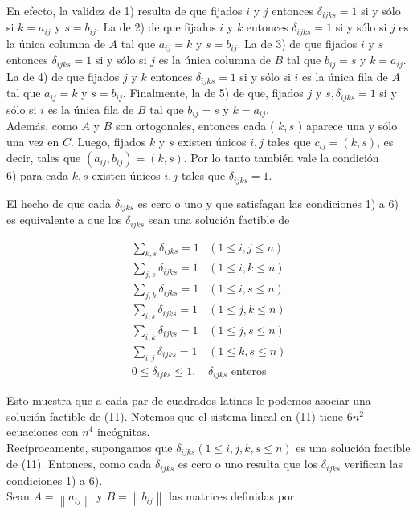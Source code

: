 \documentclass[10pt]{article}
\begin{document}
En efecto, la validez de 1) resulta de que fijados $i$ y $j$ entonces $\delta_{i j k s}=1$ si y sólo si $k=a_{i j}$ y $s=b_{i j}$. La de 2) de que fijados $i$ y $k$ entonces $\delta_{i j k s}=1$ si y sólo si $j$ es la única columna de $A$ tal que $a_{i j}=k$ y $s=b_{i j}$. La de 3) de que fijados $i$ y $s$ entonces $\delta_{i j k s}=1$ si y sólo si $j$ es la única columna de $B$ tal que $b_{i j}=s$ y $k=a_{i j}$. La de 4) de que fijados $j$ y $k$ entonces $\delta_{i j k s}=1$ si y sólo si $i$ es la única fila de $A$ tal que $a_{i j}=k$ y $s=b_{i j}$. Finalmente, la de 5) de que, fijados $j$ y $s, \delta_{i j k s}=1$ si y sólo si $i$ es la única fila de $B$ tal que $b_{i j}=s$ y $k=a_{i j}$.\\
Además, como $A$ y $B$ son ortogonales, entonces cada ( $k, s$ ) aparece una y sólo una vez en $C$. Luego, fijados $k$ y $s$ existen únicos $i, j$ tales que $c_{i j}=(k, s)$, es decir, tales que $\left(a_{i j}, b_{i j}\right)=(k, s)$. Por lo tanto también vale la condición\\
6) para cada $k, s$ existen únicos $i, j$ tales que $\delta_{i j k s}=1$.

El hecho de que cada $\delta_{i j k s}$ es cero o uno y que satisfagan las condiciones 1) a 6) es equivalente a que los $\delta_{i j k s}$ sean una solución factible de

\[
\begin{array}{ll}
\sum_{k, s} \delta_{i j k s}=1 & (1 \leq i, j \leq n) \\
\sum_{j, s} \delta_{i j k s}=1 & (1 \leq i, k \leq n) \\
\sum_{j, k} \delta_{i j k s}=1 & (1 \leq i, s \leq n) \\
\sum_{i, s} \delta_{i j k s}=1 & (1 \leq j, k \leq n)  \tag{11}\\
\sum_{i, k} \delta_{i j k s}=1 & (1 \leq j, s \leq n) \\
\sum_{i, j} \delta_{i j k s}=1 & (1 \leq k, s \leq n) \\
0 \leq \delta_{i j k s} \leq 1, & \delta_{i j k s} \text { enteros }
\end{array}
\]

Esto muestra que a cada par de cuadrados latinos le podemos asociar una solución factible de (11). Notemos que el sistema lineal en (11) tiene $6 n^{2}$ ecuaciones con $n^{4}$ incógnitas.\\
Recíprocamente, supongamos que $\delta_{i j k s}(1 \leq i, j, k, s \leq n)$ es una solución factible de (11). Entonces, como cada $\delta_{i j k s}$ es cero o uno resulta que los $\delta_{i j k s}$ verifican las condiciones 1) a 6).\\
Sean $A=\left\|a_{i j}\right\|$ y $B=\left\|b_{i j}\right\|$ las matrices definidas por
\end{document}

